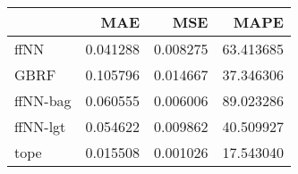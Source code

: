 \begin{tabular}{lrrr}
\toprule
{} &       MAE &       MSE &       MAPE \\
\midrule
ffNN     &  0.041288 &  0.008275 &  63.413685 \\
GBRF     &  0.105796 &  0.014667 &  37.346306 \\
ffNN-bag &  0.060555 &  0.006006 &  89.023286 \\
ffNN-lgt &  0.054622 &  0.009862 &  40.509927 \\
tope     &  0.015508 &  0.001026 &  17.543040 \\
\bottomrule
\end{tabular}
